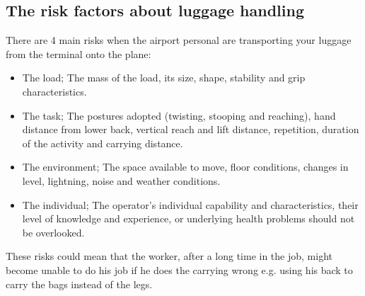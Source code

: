 \subsection{The risk factors about luggage handling}

There are 4 main risks when the airport personal are transporting your luggage from the terminal onto the plane:

\begin{itemize}
\item The load; The mass of the load, its size, shape, stability and grip characteristics.
\item The task; The postures adopted (twisting, stooping and reaching), hand distance from lower back, vertical reach and lift distance, repetition, duration of the activity and carrying distance.
\item The environment; The space available to move, floor conditions, changes in level, lightning, noise and weather conditions.
\item The individual; The operator's individual capability and characteristics, their level of knowledge and experience, or underlying health problems should not be overlooked.
\end{itemize}

These risks could mean that the worker, after a long time in the job, might become unable to do his job if he does the carrying wrong e.g. using his back to carry the bags instead of the legs.